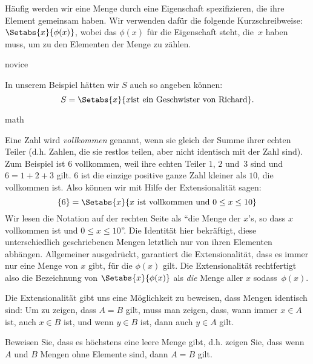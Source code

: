 \documentclass[../../../include/open-logic-section]{subfiles}
\begin{document}
Häufig werden wir eine Menge durch eine Eigenschaft spezifizieren, die ihre Element
gemeinsam haben. Wir verwenden dafür die folgende Kurzschreibweise:
$\Setabs{x}{\phi(x)}$, wobei das $\phi(x)$ für die Eigenschaft steht,
die~$x$ haben muss, um zu den Elementen der Menge zu zählen.

\begin{tagblock}{novice}
\begin{ex}
In unserem Beispiel hätten wir $S$ auch so angeben können:
\[
S = \Setabs{x}{x \text{ist ein Geschwister von Richard}}.
\]
\end{ex}
\end{tagblock}

\begin{tagblock}{math}
\begin{ex}
Eine Zahl wird \emph{vollkommen} genannt, wenn sie gleich der Summe ihrer
echten Teiler (d.h. Zahlen, die sie restlos teilen, aber nicht
identisch mit der Zahl sind). Zum Beispiel ist $6$ vollkommen, weil ihre
echten Teiler $1$, $2$ und~$3$ sind und $6 = 1 + 2 + 3$ gilt. $6$ ist die einzige positive ganze Zahl kleiner als $10$, die vollkommen ist. Also
können wir mit Hilfe der Extensionalität sagen:
\[
	\{6\} = \Setabs{x}{x\text{ ist vollkommen und }0 \leq x \leq 10}
\]
Wir lesen die Notation auf der rechten Seite als ``die Menge der $x$'s, so dass $x$
vollkommen ist und $0 \leq x \leq 10$''. Die Identität hier bekräftigt, diese unterschiedlich 
geschriebenen Mengen letztlich nur von ihren Elementen abhängen.
Allgemeiner ausgedrückt, garantiert die Extensionalität, dass es immer
nur eine Menge von $x$ gibt, für die $\phi(x)$ gilt.
Die Extensionalität rechtfertigt also die Bezeichnung von 
$\Setabs{x}{\phi(x)}$ als \emph{die} Menge aller $x$ sodass~$\phi(x)$.
\end{ex}
\end{tagblock}

Die Extensionalität gibt uns eine Möglichkeit zu beweisen, dass Mengen identisch sind: Um zu zeigen, dass $A = B$ gilt, muss man zeigen, dass, wann immer $x \in A$ ist, auch $x \in B$ ist,
und wenn $y \in B$ ist, dann auch $y \in A$ gilt.

\begin{prob}
Beweisen Sie, dass es höchstens eine leere Menge gibt, d.h. zeigen Sie, dass wenn $A$ und $B$
Mengen ohne Elemente sind, dann $A = B$ gilt.
\end{prob}
\end{document}
